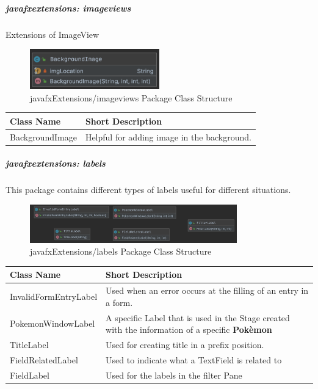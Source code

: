 \subparagraph{javafxextensions: imageviews}
Extensions of ImageView
\begin{figure}[H]
	\centering
	\includegraphics[width=0.5\textwidth]{img/javafx_imageviews_package.png}
	\caption{javafxExtensions/imageviews Package Class Structure}
\end{figure}
\begingroup
\setlength{\tabcolsep}{10pt} %
\renewcommand{\arraystretch}{1.5} %
\begin{center}
	\begin{tabular}{| m{14em} | m{19em} |} 
		\hline
		\textbf{Class Name} & \textbf{Short Description} \\ [0.5ex] 
		\hline
		BackgroundImage & Helpful for adding image in the background.\\ 
		\hline
	\end{tabular}
\end{center}
\endgroup

\subparagraph{javafxextensions: labels}
This package contains different types of labels useful for different situations.
\begin{figure}[H]
	\centering
	\includegraphics[width=0.8\textwidth]{img/javafx_labels_package.png}
	\caption{javafxExtensions/labels Package Class Structure}
\end{figure}
\begingroup
\setlength{\tabcolsep}{10pt} %
\renewcommand{\arraystretch}{1.5} %
\begin{center}
	\begin{tabular}{| m{14em} | m{19em} |} 
		\hline
		\textbf{Class Name} & \textbf{Short Description} \\ [0.5ex] 
		\hline
		InvalidFormEntryLabel & Used when an error occurs at the filling of an entry in a form.\\ 
		\hline
		PokemonWindowLabel & A specific Label that is used in the Stage created with the information of a specific \textbf{Pokèmon}\\ 
		\hline
		TitleLabel & Used for creating title in a prefix position.\\ 
		\hline
		FieldRelatedLabel & Used to indicate what a TextField is related to\\ 
		\hline
		FieldLabel & Used for the labels in the filter Pane\\ 
		\hline
	\end{tabular}
\end{center}
\endgroup


